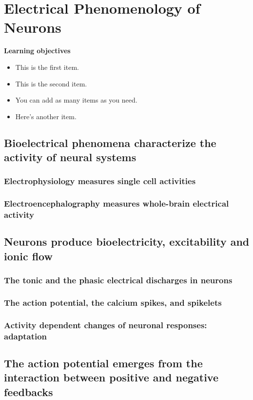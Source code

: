 \chapter{Electrical Phenomenology of Neurons}
\label{phen} %


\vspace{2cm} %

\begin{svgraybox}
{\bf{Learning objectives}}
\begin{itemize}
	\item This is the first item.
	\item This is the second item.
	\item You can add as many items as you need.
	\item Here's another item.
  \end{itemize}
\end{svgraybox}

\clearpage


\section{Bioelectrical phenomena characterize the activity of neural systems}
\subsection{Electrophysiology measures single cell activities}
\subsection{Electroencephalography measures whole-brain electrical activity}


\section{Neurons produce bioelectricity, excitability and ionic flow}
\subsection{The tonic and the phasic electrical discharges in neurons}
\subsection{The action potential, the calcium spikes, and spikelets}
\subsection{Activity dependent changes of neuronal responses: adaptation}

\section{The action potential emerges from the interaction between positive and negative feedbacks}

